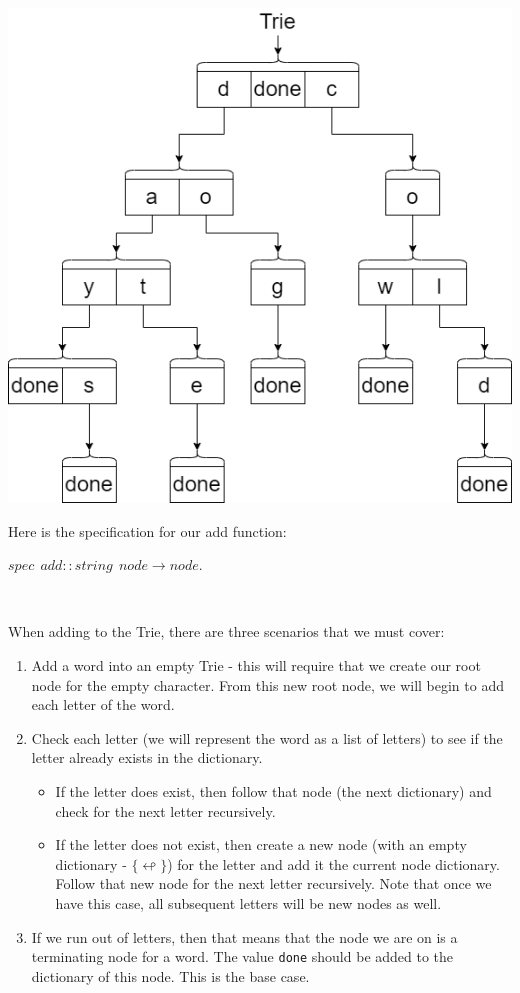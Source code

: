 \documentclass[
]{book}
\providecommand{\tightlist}{%
  \setlength{\itemsep}{0pt}\setlength{\parskip}{0pt}}
\begin{document}
\includegraphics{images/trie2.drawio.png}

Here is the specification for our add function:

\begin{formulabox}
\(spec ~ ~ add :: string ~ ~ node \rightarrow node.\)

\end{formulabox}

\(\nonumber\)

When adding to the Trie, there are three scenarios that we must cover:

\begin{enumerate}
\def\labelenumi{\arabic{enumi}.}
\tightlist
\item
  Add a word into an empty Trie - this will require that we create our root node for the empty character. From this new root node, we will begin to add each letter of the word.
\item
  Check each letter (we will represent the word as a list of letters) to see if the letter already exists in the dictionary.

  \begin{itemize}
  \tightlist
  \item
    If the letter does exist, then follow that node (the next dictionary) and check for the next letter recursively.
  \item
    If the letter does not exist, then create a new node (with an empty dictionary - \(\lbrace \looparrowleft \rbrace\)) for the letter and add it the current node dictionary. Follow that new node for the next letter recursively. Note that once we have this case, all subsequent letters will be new nodes as well.
  \end{itemize}
\item
  If we run out of letters, then that means that the node we are on is a terminating node for a word. The value \texttt{done} should be added to the dictionary of this node. This is the base case.
\end{enumerate}
\end{document}
